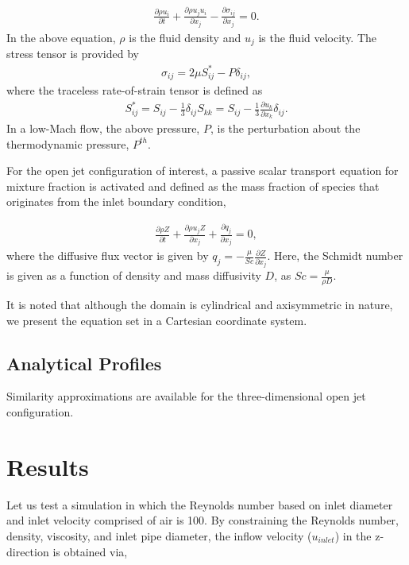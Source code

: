 \documentclass{article}
\begin{document}
\begin{align}
  \frac {\partial \rho u_i }{\partial t} + \frac{ \partial \rho u_j u_i}{\partial x_j} 
-\frac{\partial \sigma_{ij}}{\partial x_j} = 0.
\label{eq:momEq}
\end{align}
%
In the above equation, $\rho$ is the fluid density and $u_j$ is the fluid velocity. 
The stress tensor is provided by
\begin{align}
\sigma_{ij}  = 2 \mu S^*_{ij} - P \delta_{ij},
\end{align}
%
where the traceless rate-of-strain tensor is defined as
\begin{align}
S^*_{ij}  = S_{ij} - \frac{1}{3} \delta_{ij} S_{kk} \nonumber
		     = S_{ij} - \frac{1}{3} \frac{\partial  u_k }{\partial x_k}\delta_{ij}.
\end{align}
In a low-Mach flow, the above pressure, $P$, is the perturbation about the thermodynamic
pressure, $P^{th}$. 

For the open jet configuration of interest, a passive scalar transport equation for mixture 
fraction is activated and defined as the mass fraction of species that originates 
from the inlet boundary condition,

\begin{align}
  \frac {\partial \rho Z }{\partial t} + \frac{ \partial \rho u_j Z}{\partial x_j} 
+\frac{\partial q_j }{\partial x_j} = 0,
\label{eq:zEq}
\end{align}
where the diffusive flux vector is given by $q_j = -\frac{\mu}{Sc}\frac{\partial Z}{\partial x_j}$.
Here, the Schmidt number is given as a function of density and mass diffusivity $D$, as
$Sc = \frac{\mu}{\rho D}$. 

It is noted that although the domain is cylindrical and axisymmetric in nature, we present
the equation set in a Cartesian coordinate system.

\subsection{Analytical Profiles}
Similarity approximations are available for the three-dimensional open jet configuration.

\section{Results}
Let us test a simulation in which the Reynolds number based on inlet diameter and 
inlet velocity comprised of air is 100. By constraining the Reynolds number, density, viscosity,
and inlet pipe diameter, the inflow velocity ($u_{inlet}$) in the z-direction is obtained via,
\end{document}

